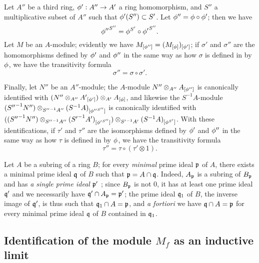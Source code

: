 \begin{env}[1.5.7]
\label{0.1.5.7}
Let $A''$ be a third ring, $\phi':A''\to A'$ a ring homomorphism, and $S''$ a
multiplicative subset of $A''$ such that $\phi'(S'')\subset S'$. Let
$\phi''=\phi\circ\phi'$; then we have
\[
  {\phi''}^{S''}=\phi^{S'}\circ{\phi'}^{S''}.
\]
Let $M$ be an $A$-module; evidently we have
$M_{[\phi'']}=(M_{[\phi]})_{[\phi']}$; if $\sigma'$ and $\sigma''$ are the
homomorphisms defined by $\phi'$ and $\phi''$ in the same way as how $\sigma$ is defined in
 by $\phi$, we have the transitivity formula
\[
  \sigma''=\sigma\circ\sigma'.
\]

Finally, let $N''$ be an $A''$-module; the $A$-module
$N''\otimes_{A''}A_{[\phi'']}$ is canonically identified with
$(N''\otimes_{A''}{A'}_{[\phi']})\otimes_{A'}A_{[\phi]}$, and likewise the
$S^{-1}A$-module
$({S''}^{-1}N'')\otimes_{{S''}^{-1}A''}(S^{-1}A)_{[{\phi''}^{S''}]}$ is
canonically identified with
$(({S''}^{-1}N'')\otimes_{{S''}^{-1}A''}({S'}^{-1}A')_{[{\phi'}^{S''}]})
  \otimes_{{S'}^{-1}A'}(S^{-1}A)_{[\phi^{S'}]}$. With these identifications, if
$\tau'$ and $\tau''$ are the isomorphisms defined by $\phi'$ and $\phi''$ in the same way as how
$\tau$ is defined in  by $\phi$, we have the transitivity
formula
\[
  \tau''=\tau\circ(\tau'\otimes 1).
\]
\end{env}

\begin{env}[1.5.8]
\label{0.1.5.8}
Let $A$ be a subring of a ring $B$; for every {\em minimal} prime ideal
$\mathfrak{p}$ of $A$, there exists a minimal prime ideal $\mathfrak{q}$ of $B$
such that $\mathfrak{p}=A\cap\mathfrak{q}$. Indeed, $A_\mathfrak{p}$ is a
subring of $B_\mathfrak{p}$  and has {\em a single prime
ideal $\mathfrak{p}'$} ; since $B_\mathfrak{p}$ is not
$0$, it has at least one prime ideal $\mathfrak{q}'$ and we necessarily have
$\mathfrak{q}'\cap A_\mathfrak{p}=\mathfrak{p}'$; the prime ideal
$\mathfrak{q}_1$ of $B$, the inverse image of $\mathfrak{q}'$, is thus such that
$\mathfrak{q}_1\cap A=\mathfrak{p}$, and {\em a fortiori} we have
$\mathfrak{q}\cap A=\mathfrak{p}$ for every minimal prime ideal $\mathfrak{q}$
of $B$ contained in $\mathfrak{q}_1$.
\end{env}

\subsection{Identification of the module $M_f$ as an inductive limit}
\label{subsection-localization-as-inductive-limit}

